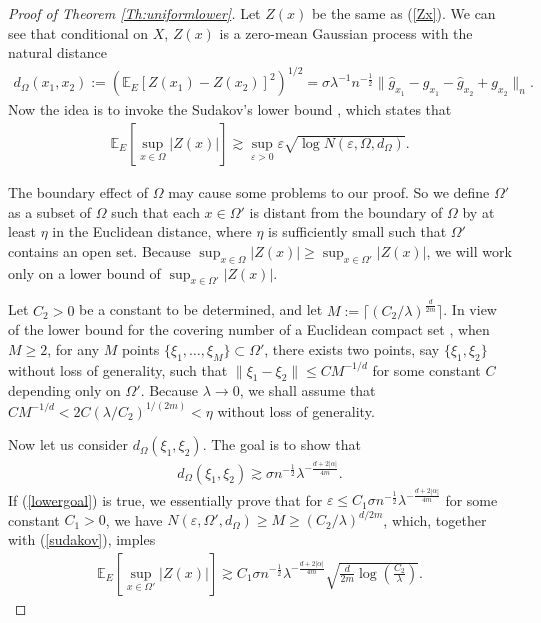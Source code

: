 \documentclass[12pt]{article}
\theoremstyle{plain}
\theoremstyle{remark}
\begin{document}
\begin{proof}[Proof of Theorem \ref{Th:uniformlower}]
    Let $Z(x)$ be the same as (\ref{Zx}). We can see that conditional on $X$, $Z(x)$ is a zero-mean Gaussian process with the natural distance
    \begin{eqnarray*}
        d_{\Omega}(x_1,x_2):=\left(\mathbb{E}_E [Z(x_1)-Z(x_2)]^2\right)^{1/2}=\sigma\lambda^{-1}n^{-\frac{1}{2}}\|\hat{g}_{x_1}-g_{x_1}-\hat{g}_{x_2}+g_{x_2}\|_n.
    \end{eqnarray*}
    Now the idea is to invoke the Sudakov's lower bound \citep{vershynin2018high}, which states that
    \begin{eqnarray}\label{sudakov}
        \mathbb{E}_E\left[\sup_{x\in\Omega}|Z(x)|\right]\gtrsim \sup_{\varepsilon>0}\varepsilon\sqrt{\log N(\varepsilon,\Omega,d_\Omega)}.
    \end{eqnarray}

    The boundary effect of $\Omega$ may cause some problems to our proof. So we define $\Omega'$ as a subset of $\Omega$ such that each $x\in\Omega'$ is distant from the boundary of $\Omega$ by at least $\eta$ in the Euclidean distance, where $\eta$ is sufficiently small such that $\Omega'$ contains an open set. Because $\sup_{x\in\Omega}|Z(x)|\geq \sup_{x\in\Omega'}|Z(x)|$, we will work only on a lower bound of $\sup_{x\in\Omega'}|Z(x)|$.
    
    Let $C_2>0$ be a constant to be determined, and let $M:=\lceil (C_2/\lambda)^{\frac{d}{2m}} \rceil$. In view of the lower bound for the covering number of a Euclidean compact set \citep{pollard1990empirical}, when $M\geq 2$, for any $M$ points $\{\xi_1,\ldots,\xi_M\}\subset\Omega'$, there exists two points, say $\{\xi_1,\xi_2\}$ without loss of generality, such that $\|\xi_1-\xi_2\|\leq C M^{-1/d}$ for some constant $C$ depending only on $\Omega'$.    
    Because $\lambda\rightarrow 0$, we shall assume that $C M^{-1/d}<2C (\lambda/C_2)^{1/(2m)}<\eta$ without loss of generality.

    Now let us consider $d_\Omega(\xi_1,\xi_2)$. The goal is to show that 
    \begin{eqnarray}\label{lowergoal}
    d_\Omega(\xi_1,\xi_2)\gtrsim \sigma n^{-\frac{1}{2}}\lambda^{-\frac{d+2|\alpha|}{4m}}.
    \end{eqnarray}
    If (\ref{lowergoal}) is true, we essentially prove that for $\varepsilon\leq C_1 \sigma n^{-\frac{1}{2}}\lambda^{-\frac{d+2|\alpha|}{4m}}$ for some constant $C_1>0$, we have $N(\varepsilon,\Omega',d_\Omega)\geq M\geq (C_2/\lambda)^{d/2m}$, which, together with (\ref{sudakov}), imples
    \begin{eqnarray}\label{GPlower}
        \mathbb{E}_E\left[\sup_{x\in\Omega'}|Z(x)|\right]\gtrsim C_1 \sigma n^{-\frac{1}{2}}\lambda^{-\frac{d+2|\alpha|}{4m}}\sqrt{\frac{d}{2m}\log\left(\frac{C_2}{\lambda}\right)}.
    \end{eqnarray}


\end{proof}
\end{document}
